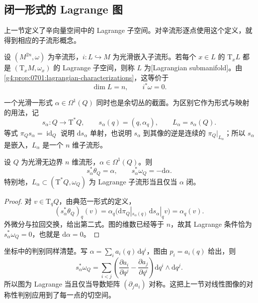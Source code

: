 \subsection{闭一形式的 Lagrange 图}
\label{g4:subsec:0702:04}

上一节定义了辛向量空间中的 Lagrange 子空间。对辛流形逐点使用这个定义，就得到相应的子流形概念。

\begin{definition}
	\label{g4:def:0702:lagrangian-submanifold}
	设 \((M^{2n},\omega)\) 为辛流形，\(i:L\hookrightarrow M\) 为光滑嵌入子流形。若每个 \(x\in L\) 的 \(\mathrm{T}_xL\) 都是 \((\mathrm{T}_xM,\omega_x)\) 的 Lagrange 子空间，则称 \(L\) 为[Lagrangian submanifold]。由\cref{g4:prop:0701:lagrangian-characterizations}，这等价于
	\[
		\dim L=n,\qquad i^*\omega=0.
	\]
\end{definition}

一个光滑一形式 \(\alpha\in\Omega^1(Q)\) 同时也是余切丛的截面。为区别它作为形式与映射的用法，记
\[
	s_\alpha:Q\longrightarrow\mathrm{T}^*Q,\qquad
	s_\alpha(q)=(q,\alpha_q),\qquad
	L_\alpha=s_\alpha(Q).
\]
等式 \(\pi_Qs_\alpha=\operatorname{id}_Q\) 说明 \(\mathrm{d}s_\alpha\) 单射，也说明 \(s_\alpha\) 到其像的逆是连续的 \(\pi_Q|_{L_\alpha}\)；所以 \(s_\alpha\) 是嵌入，\(L_\alpha\) 是一个 \(n\) 维子流形。

\begin{proposition}
	\label{g4:prop:0702:lagrangian-graph}
	设 \(Q\) 为光滑无边界 \(n\) 维流形，\(\alpha\in\Omega^1(Q)\)。则
	\begin{equation}
		\label{g4:eq:0702:section-pullback}
		s_\alpha^*\theta_Q=\alpha,\qquad
		s_\alpha^*\omega_Q=-\mathrm{d}\alpha.
	\end{equation}
	特别地，\(L_\alpha\subset(\mathrm{T}^*Q,\omega_Q)\) 为 Lagrange 子流形当且仅当 \(\alpha\) 闭。
\end{proposition}
\begin{proof}
	对 \(v\in\mathrm{T}_qQ\)，由典范一形式的定义，
	\[
		(s_\alpha^*\theta_Q)_q(v)
		=\alpha_q\bigl(\mathrm{d}\pi_Q|_{s_\alpha(q)}
			\,\mathrm{d}s_\alpha|_qv\bigr)
		=\alpha_q(v).
	\]
	外微分与拉回交换，给出第二式。图的维数已经等于 \(n\)，故其 Lagrange 条件恰为 \(s_\alpha^*\omega_Q=0\)，也就是 \(\mathrm{d}\alpha=0\)。
\end{proof}

坐标中的判别同样清楚。写 \(\alpha=\sum_i a_i(q)\,\mathrm{d}q^i\)，图由 \(p_i=a_i(q)\) 给出，则
\[
	s_\alpha^*\omega_Q
	=\sum_{i<j}
	\left(\frac{\partial a_i}{\partial q^j}
	-\frac{\partial a_j}{\partial q^i}\right)
	\mathrm{d}q^i\wedge\mathrm{d}q^j.
\]
所以图为 Lagrange 当且仅当导数矩阵 \((\partial_j a_i)\) 对称。这把上一节对线性图像的对称性判别应用到了每一点的切空间。

